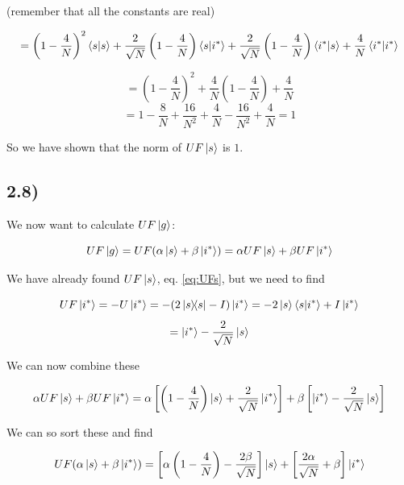 \documentclass[a4paper,norsk, 10pt]{article}
\begin{document}
(remember that all the constants are real)

\begin{equation*}
= \left(1 - \frac{4}{N}\right)^2\braket{s}{s} +\frac{2}{\sqrt{N}} \left(1 - \frac{4}{N}\right)\bra{s}\ket{i^*} + \frac{2}{\sqrt{N}} \left(1 - \frac{4}{N}\right)\bra{i^*}\ket{s} + \frac{4}{N}\braket{i^*}{i^*}
\end{equation*}

\begin{equation*}
= \left(1 - \frac{4}{N}\right)^2 + \frac{4}{N}\left(1 - \frac{4}{N}\right) + \frac{4}{N}
\end{equation*}
\begin{equation}
= 1 - \frac{8}{N} + \frac{16}{N^2} + \frac{4}{N} - \frac{16}{N^2} + \frac{4}{N} = 1
\end{equation}


So we have shown that the norm of $UF\ket{s}$ is $1$.


\subsection{2.8)}

We now want to calculate $UF\ket{g}$:

\begin{equation}
UF\ket{g} = UF(\alpha\ket{s} + \beta\ket{i^*}) = \alpha UF\ket{s} + \beta UF\ket{i^*}
\end{equation}

We have already found $UF\ket{s}$, eq. \eqref{eq:UFs}, but we need to find

\begin{equation}
UF\ket{i^*} = -U\ket{i^*} = -(2\ketbra{s}{s} - I)\ket{i^*} = -2\ket{s}\braket{s}{i^*} + I\ket{i^*}
\end{equation}
\begin{equation}
= \ket{i^*} - \frac{2}{\sqrt{N}}\ket{s}
\end{equation}


We can now combine these

\begin{equation}
\alpha UF\ket{s} + \beta UF\ket{i^*} = \alpha\left[\left(1 - \frac{4}{N}\right)\ket{s} + \frac{2}{\sqrt{N}}\ket{i^*} \right] + \beta\left[\ket{i^*} - \frac{2}{\sqrt{N}}\ket{s}\right]
\end{equation}

We can so sort these and find 

\begin{equation}
UF(\alpha\ket{s} + \beta\ket{i^*}) = \left[\alpha\left(1 - \frac{4}{N}\right) - \frac{2\beta}{\sqrt{N}}\right]\ket{s} + \left[\frac{2\alpha}{\sqrt{N}} + \beta\right]\ket{i^*}
\label{eq:UFg}
\end{equation}
\end{document}
